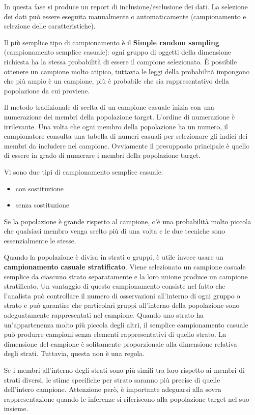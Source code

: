 \documentclass[a4paper]{extarticle}
\begin{document}
In questa fase si produce un report di inclusione/esclusione dei dati. La selezione dei dati può essere eseguita manualmente o automaticamente (campionamento e selezione delle caratteristiche).

Il più semplice tipo di campionamento è il \textbf{Simple random sampling} (campionamento semplice casuale): ogni gruppo di oggetti della dimensione richiesta ha la stessa probabilità di essere il campione selezionato. È possibile ottenere un campione molto atipico, tuttavia le leggi della probabilità impongono che più ampio è un campione, più è probabile che sia rappresentativo della popolazione da cui proviene. 

Il metodo tradizionale di scelta di un campione casuale inizia con una numerazione dei membri della popolazione target. L'ordine di numerazione è irrilevante. Una volta che ogni membro della popolazione ha un numero, il campionatore consulta una tabella di numeri casuali per selezionare gli indici dei membri da includere nel campione. Ovviamente il presupposto principale è quello di essere in grado di numerare i membri della popolazione target. 

Vi sono due tipi di campionamento semplice casuale:
\begin{itemize}
\item con sostituzione
\item senza sostituzione
\end{itemize}

Se la popolazione è grande rispetto al campione, c'è una probabilità molto piccola che qualsiasi membro venga scelto più di una volta e le due tecniche sono essenzialmente le stesse.

Quando la popolazione è divisa in strati o gruppi, è utile invece usare un \textbf{campionamento casuale stratificato}. Viene selezionato un campione casuale semplice da ciascuno strato separatamente e la loro unione produce un campione stratificato. Un vantaggio di questo campionamento consiste nel fatto che l'analista può controllare il numero di osservazioni all'interno di ogni gruppo o strato e può garantire che particolari gruppi all'interno della popolazione sono adeguatamente rappresentati nel campione. Quando uno strato ha un'appartenenza molto più piccola degli altri, il semplice campionamento casuale può produrre campioni senza elementi rappresentativi di quello strato. La dimensione del campione è solitamente proporzionale alla dimensione relativa degli strati. Tuttavia, questa non è una regola.

Se i membri all'interno degli strati sono più simili tra loro rispetto ai membri di strati diversi, le stime specifiche per strato saranno più precise di quelle dell'intero campione. Attenzione però, è importante adeguarsi alla sovra rappresentazione quando le inferenze si riferiscono alla popolazione target nel suo insieme.
\end{document}
